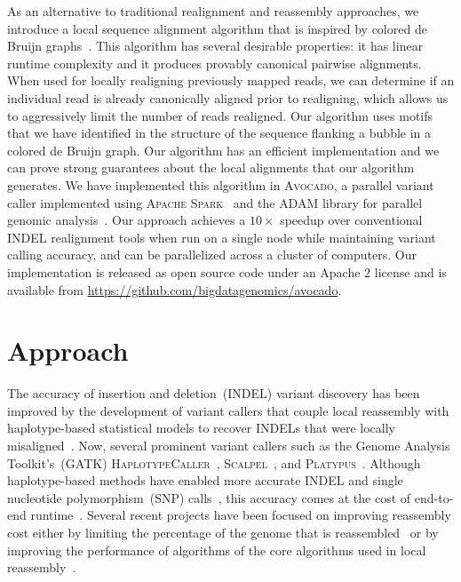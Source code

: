 \documentclass{bioinfo}
\begin{document}
As an alternative to traditional realignment and reassembly approaches, we
introduce a local sequence alignment algorithm that is inspired by colored de
Bruijn graphs~\citep{iqbal12}. This algorithm has several desirable properties:
it has linear runtime complexity and it produces provably canonical pairwise
alignments. When used for locally realigning previously mapped reads, we can
determine if an individual read is already canonically aligned prior to
realigning, which allows us to aggressively limit the number of reads realigned.
Our algorithm uses motifs that we have identified in the structure of the
sequence flanking a bubble in a colored de Bruijn graph. Our algorithm has an
efficient implementation and we can prove strong guarantees about the local
alignments that our algorithm generates. We have implemented this algorithm in
\textsc{Avocado}, a parallel variant caller implemented using \textsc{Apache
Spark}~\citep{zaharia12, zaharia10} and the \textsc{ADAM} library for parallel
genomic analysis~\citep{massie13, nothaft15}. Our approach achieves a $10\times$
speedup over conventional INDEL realignment tools when run on a single node
while maintaining variant calling accuracy, and can be parallelized across a
cluster of computers. Our implementation is released as open source code under
an Apache 2 license and is available from
\url{https://github.com/bigdatagenomics/avocado}.

\section{Approach}

The accuracy of insertion and deletion~(INDEL) variant discovery has been improved by the development
of variant callers that couple local reassembly with haplotype-based statistical models to recover INDELs
that were locally misaligned~\citep{albers11}. Now, several prominent variant callers such as the Genome
Analysis Toolkit's~(GATK) \textsc{HaplotypeCaller}~\citep{depristo11}, \textsc{Scalpel}~\citep{narzisi14}, and
\textsc{Platypus}~\citep{rimmer14}. Although haplotype-based methods have enabled more accurate INDEL
and single nucleotide polymorphism~(SNP) calls~\citep{bao14}, this accuracy comes at the cost of
end-to-end runtime~\citep{talwalkar14}. Several recent projects have been focused on improving
reassembly cost either by limiting the percentage of the genome that is reassembled~\citep{bloniarz14} or
by improving the performance of algorithms of the core algorithms used in local
reassembly~\citep{rimmer14}.
\end{document}
